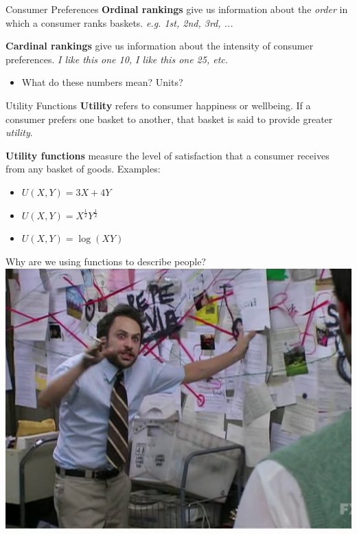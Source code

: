 \documentclass[11pt,t]{beamer}
\begin{document}
\begin{frame}{Consumer Preferences}
  \textbf{Ordinal rankings} give us information about the \textit{order} in which a consumer ranks baskets. \emph{e.g. 1st, 2nd, 3rd, ...}


  \pause\bigskip
  \textbf{Cardinal rankings} give us information about the intensity of consumer preferences. \emph{I like this one 10, I like this one 25, etc.}

  \begin{itemize}
    \item What do these numbers mean? Units?
  \end{itemize}
\end{frame}

\begin{frame}{Utility Functions}
  \textbf{Utility} refers to consumer happiness or wellbeing. If a consumer prefers one basket to another, that basket is said to provide greater \textit{utility}.
  
  \pause\bigskip
  \textbf{Utility functions} measure the level of satisfaction that a consumer receives from any basket of goods. Examples:
  \begin{itemize}
    \item $U(X,Y) = 3X + 4Y$
    \item $U(X,Y) = X^{\frac{1}{2}}Y^{\frac{1}{2}}$
    \item $U(X,Y) = \log(XY)$
  \end{itemize}
\end{frame}

\begin{frame}{Why are we using functions to describe people?}
  \includegraphics[width=\linewidth]{figures/charlie_meme.jpeg}
\end{frame}
\end{document}
